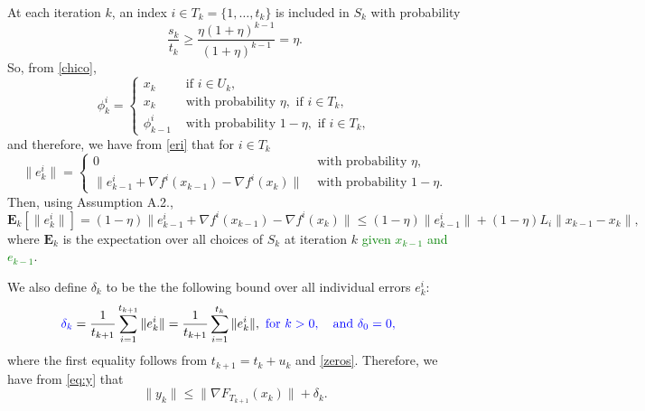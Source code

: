 \documentclass[11pt]{article}
\newcommand{\E}{\mathbf{E}}
\begin{document}
At each iteration $k$, an index $i\in T_k =  \{1,\ldots,t_k\}$ is included in $S_k$ with probability 
\begin{equation}
    \frac{s_k}{t_k}  \geq \frac{\eta (1+\eta)^{k-1}}{(1+\eta)^{k-1}} = \eta . 
 \end{equation}
 So, from \eqref{chico}, 
\[
\phi_{k}^i=
 \begin{cases}
   x_k &\mbox{ if } i\in U_k, \\
   x_k  &\mbox{ with probability }\eta , \mbox{ if } i \in T_k,\\
   \phi_{k-1}^i & \mbox{ with probability }1-\eta , \mbox{ if } i \in T_k,
 \end{cases}
\]
and therefore, we have from \eqref{eri} that for $i\in T_k$
\[
\|e_k^i\| =
 \begin{cases}
  0  & \mbox{ with probability }\eta,\\
  \|e_{k-1}^i + \nabla f^i(x_{k-1}) - \nabla f^i(x_k) \| & \mbox{ with probability }1-\eta .
 \end{cases}
\]
 Then, using Assumption A.2., 
 \begin{equation}\label{eq:expec}
 \E_k[\|e_k^i\|] = (1-\eta)\|e_{k-1}^i + \nabla f^i(x_{k-1}) - \nabla f^i(x_k) \| \leq (1-\eta)\|e_{k-1}^i\| + (1-\eta)L_i \|x_{k-1} - x_k\|,
\end{equation}
where $\E_k$ is the expectation over all choices of $S_k$ at iteration $k$ \textcolor{green}{given $x_{k-1}$ and $e_{k-1}$}. 

We also {\color{blue} define $\delta_k$} to be the the following bound over  all individual errors $e_k^i$:
\begin{align}
 {\color{blue} \delta_k } &= \frac{1}{t_{k+1}} \sum_{i=1}^{t_{k+1}} \|e_k^i\| = \frac{1}{t_{k+1}}\sum_{i=1}^{t_k}\|e_k^i\| , 
      {\color{blue}  \ \mbox{for} \  k>0,  \quad\mbox{and} \ \delta_0=0, }      \label{eq:defe}
\end{align}
where the first equality follows from $t_{k+1}= t_k +u_k$ and  
\eqref{zeros}. Therefore, we have from \eqref{eq:y} that
\begin{equation} \label{yfe}
    \| y_k \| \leq \| \nabla F_{T_{k+1}}(x_k) \| + \delta_k.
\end{equation}  
\end{document}
